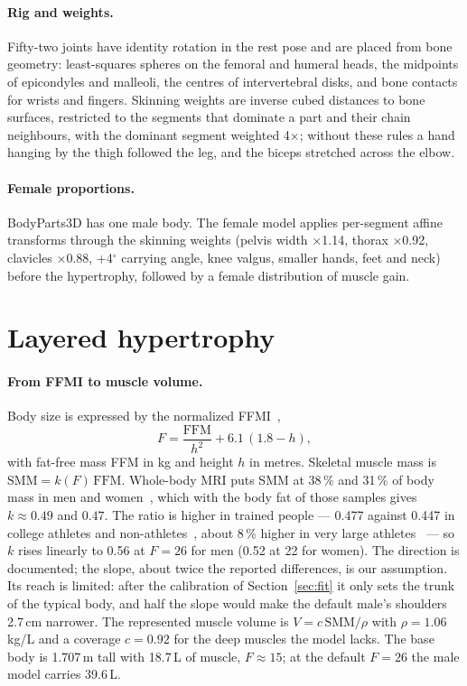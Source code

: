 \documentclass[10pt,twocolumn]{article}
\begin{document}
\paragraph{Rig and weights.}
Fifty-two joints have identity rotation in the rest pose and are placed from bone geometry:
least-squares spheres on the femoral and humeral heads, the midpoints of epicondyles and malleoli,
the centres of intervertebral disks, and bone contacts for wrists and fingers. Skinning weights are
inverse cubed distances to bone surfaces, restricted to the segments that dominate a part and their
chain neighbours, with the dominant segment weighted 4$\times$; without these rules a hand hanging
by the thigh followed the leg, and the biceps stretched across the elbow.

\paragraph{Female proportions.}
BodyParts3D has one male body. The female model applies per-segment affine transforms through the
skinning weights (pelvis width $\times$1.14, thorax $\times$0.92, clavicles $\times$0.88, +4$^\circ$
carrying angle, knee valgus, smaller hands, feet and neck) before the hypertrophy, followed by a
female distribution of muscle gain.

\section{Layered hypertrophy}\label{sec:hypertrophy}

\paragraph{From FFMI to muscle volume.}
Body size is expressed by the normalized FFMI~\cite{kouri1995ffmi},
\begin{equation}
F = \frac{\mathrm{FFM}}{h^2} + 6.1\,(1.8 - h),
\end{equation}
with fat-free mass FFM in kg and height $h$ in metres. Skeletal muscle mass is
$\mathrm{SMM}=k(F)\,\mathrm{FFM}$. Whole-body MRI puts SMM at 38\,\% and 31\,\% of body mass in men and
women~\cite{janssen2000smm}, which with the body fat of those samples gives $k\approx0.49$ and $0.47$.
The ratio is higher in trained people --- 0.477 against 0.447 in college athletes and
non-athletes~\cite{midorikawa2007athletes}, about 8\,\% higher in very large
athletes~\cite{abe2018upperlimit} --- so $k$ rises linearly to 0.56 at $F=26$ for men (0.52 at 22 for
women). The direction is documented; the slope, about twice the reported differences, is our
assumption. Its reach is limited: after the calibration of Section~\ref{sec:fit} it only sets the
trunk of the typical body, and half the slope would make the default male's shoulders 2.7\,cm
narrower. The represented muscle volume is $V = c\,\mathrm{SMM}/\rho$ with $\rho = 1.06$\,kg/L and a
coverage $c = 0.92$ for the deep muscles the model lacks. The base body is 1.707\,m tall with
18.7\,L of muscle, $F \approx 15$; at the default $F = 26$ the male model carries 39.6\,L.
\end{document}
